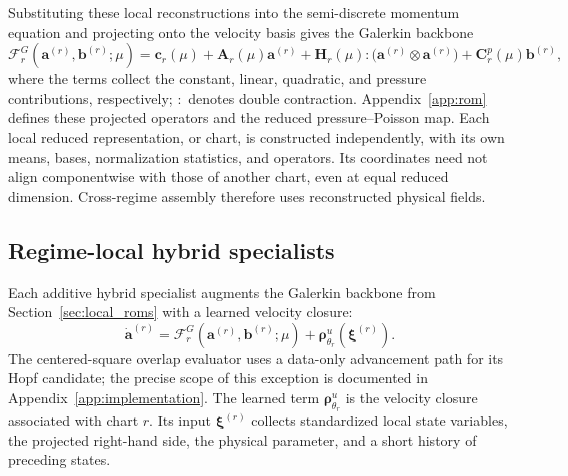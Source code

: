Substituting these local reconstructions into the semi-discrete momentum
equation and projecting onto the velocity basis gives the Galerkin backbone
\begin{equation}
  \mathcal F_r^{G}(\bm a^{(r)},\bm b^{(r)};\mu)
  =\bm c_r(\mu)+\bm A_r(\mu)\bm a^{(r)}
  +\bm H_r(\mu):\bigl(\bm a^{(r)}\otimes\bm a^{(r)}\bigr)
  +\bm C_r^p(\mu)\bm b^{(r)},
  \label{eq:main_galerkin_backbone}
\end{equation}
where the terms collect the constant, linear, quadratic, and pressure
contributions, respectively; $:$ denotes double contraction.
Appendix~\ref{app:rom} defines these projected operators and the
reduced pressure--Poisson map.
Each local reduced representation, or chart, is constructed independently,
with its own means, bases, normalization statistics, and operators.
Its coordinates need not align componentwise with those of another chart,
even at equal reduced dimension. Cross-regime assembly therefore uses
reconstructed physical fields.

\subsection{Regime-local hybrid specialists}

Each additive hybrid specialist augments the Galerkin backbone from
Section~\ref{sec:local_roms} with a learned velocity closure:
\begin{equation}
  \dot{\bm a}^{(r)}=
  \mathcal F_r^{G}(\bm a^{(r)},\bm b^{(r)};\mu)
  +\bm\rho^u_{\theta_r}(\bm\xi^{(r)}).
  \label{eq:main_specialist}
\end{equation}
The centered-square overlap evaluator uses a data-only advancement path for its Hopf candidate; the precise scope of this exception is documented in Appendix~\ref{app:implementation}. The learned term $\bm\rho^u_{\theta_r}$ is the velocity closure associated with chart $r$. Its input $\bm\xi^{(r)}$ collects standardized local state variables, the projected right-hand side, the physical parameter, and a short history of preceding states.

